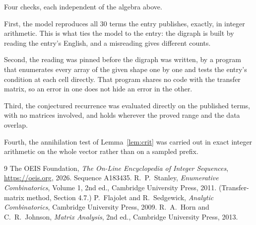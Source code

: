\documentclass[11pt,a4paper]{article}
\theoremstyle{plain}
\theoremstyle{definition}
\begin{document}
Four checks, each independent of the algebra above.

First, the model reproduces all $30$ terms the entry publishes, exactly, in integer
arithmetic. This is what ties the model to the entry: the digraph is built by reading the
entry's English, and a misreading gives different counts.

Second, the reading was pinned before the digraph was written, by a program that enumerates
every array of the given shape one by one and tests the entry's condition at each cell
directly. That program shares no code with the transfer matrix, so an error in one does not
hide an error in the other.

Third, the conjectured recurrence was evaluated directly on the published terms, with no
matrices involved, and holds wherever the proved range and the data overlap.

Fourth, the annihilation test of Lemma~\ref{lem:crit} was carried out in exact integer
arithmetic on the whole vector rather than on a sampled prefix.

\begin{thebibliography}{9}
 The OEIS Foundation, \emph{The On-Line Encyclopedia of Integer
Sequences}, \url{https://oeis.org}, 2026. Sequence A183435.
 R.~P.~Stanley, \emph{Enumerative Combinatorics}, Volume 1, 2nd ed.,
Cambridge University Press, 2011. (Transfer-matrix method, Section 4.7.)
 P.~Flajolet and R.~Sedgewick, \emph{Analytic Combinatorics}, Cambridge
University Press, 2009.
 R.~A.~Horn and C.~R.~Johnson, \emph{Matrix Analysis}, 2nd ed., Cambridge
University Press, 2013.
\end{thebibliography}
\end{document}
